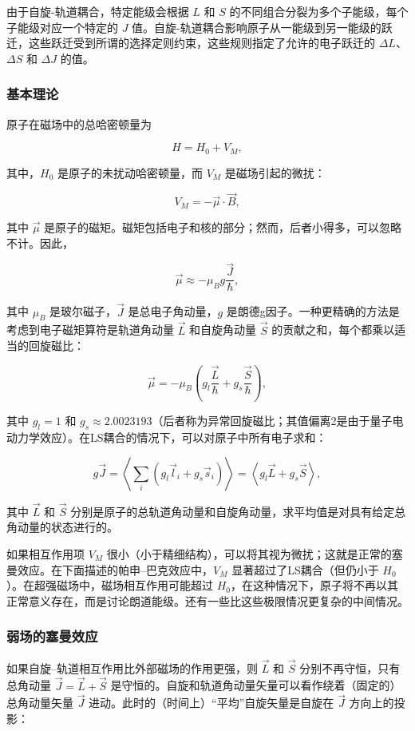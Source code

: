 \documentclass[dvipsnames, svgnames,a4paper,11pt]{article}
\begin{document}
	由于自旋-轨道耦合，特定能级会根据 \(L\) 和 \(S\) 的不同组合分裂为多个子能级，每个子能级对应一个特定的 \(J\) 值。自旋-轨道耦合影响原子从一能级到另一能级的跃迁，这些跃迁受到所谓的选择定则约束，这些规则指定了允许的电子跃迁的 \(\Delta L\)、\(\Delta S\) 和 \(\Delta J\) 的值。
	
	\subsubsection{基本理论}
	
	原子在磁场中的总哈密顿量为
	
	$$
	H = H_0 + V_M,
	$$
	
	其中，$H_0$ 是原子的未扰动哈密顿量，而 $V_M$ 是磁场引起的微扰：
	
	$$
	V_M = - \vec{\mu} \cdot \vec{B},
	$$
	
	其中 $\vec{\mu}$ 是原子的磁矩。磁矩包括电子和核的部分；然而，后者小得多，可以忽略不计。因此，
	
	$$
	\vec{\mu} \approx -\mu_B g \frac{\vec{J}}{\hbar},
	$$
	
	其中 $\mu_B$ 是玻尔磁子，$\vec{J}$ 是总电子角动量，$g$ 是朗德g因子。一种更精确的方法是考虑到电子磁矩算符是轨道角动量 $\vec{L}$ 和自旋角动量 $\vec{S}$ 的贡献之和，每个都乘以适当的回旋磁比：
	
	$$
	\vec{\mu} = -\mu_B \left( g_l \frac{\vec{L}}{\hbar} + g_s \frac{\vec{S}}{\hbar} \right),
	$$
	
	其中 $g_l = 1$ 和 $g_s \approx 2.0023193$（后者称为异常回旋磁比；其值偏离2是由于量子电动力学效应）。在LS耦合的情况下，可以对原子中所有电子求和：
	
	$$
	g \vec{J} = \left\langle \sum_i \left( g_l \vec{l}_i + g_s \vec{s}_i \right) \right\rangle = \left\langle g_l \vec{L} + g_s \vec{S} \right\rangle,
	$$
	
	其中 $\vec{L}$ 和 $\vec{S}$ 分别是原子的总轨道角动量和自旋角动量，求平均值是对具有给定总角动量的状态进行的。
	
	如果相互作用项 $V_M$ 很小（小于精细结构），可以将其视为微扰；这就是正常的塞曼效应。在下面描述的帕申–巴克效应中，$V_M$ 显著超过了LS耦合（但仍小于 $H_0$）。在超强磁场中，磁场相互作用可能超过 $H_0$，在这种情况下，原子将不再以其正常意义存在，而是讨论朗道能级。还有一些比这些极限情况更复杂的中间情况。
	
	\subsubsection{弱场的塞曼效应}
	
	如果自旋–轨道相互作用比外部磁场的作用更强，则 $\vec{L}$ 和 $\vec{S}$ 分别不再守恒，只有总角动量 $\vec{J} = \vec{L} + \vec{S}$ 是守恒的。自旋和轨道角动量矢量可以看作绕着（固定的）总角动量矢量 $\vec{J}$ 进动。此时的（时间上）“平均”自旋矢量是自旋在 $\vec{J}$ 方向上的投影：
	
\end{document}
